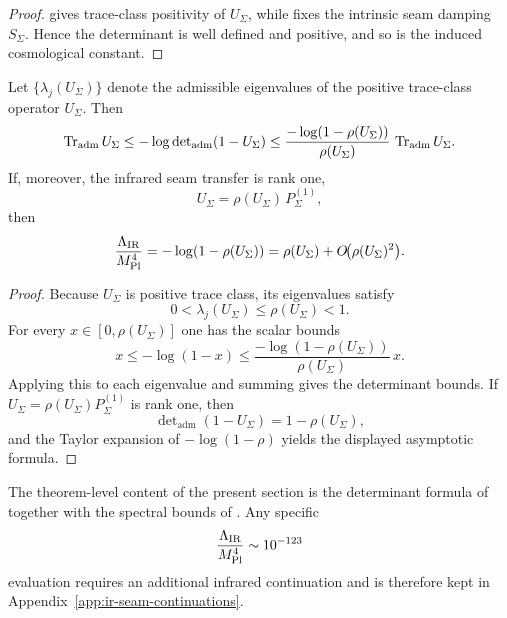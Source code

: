 \begin{proof}
 gives trace-class positivity of
$U_\Sigma$, while  fixes the intrinsic seam damping $S_\Sigma$.
Hence the determinant is well defined and positive, and so is the induced cosmological constant.
\end{proof}

\begin{corollary}
\label{cor:ir-seam-transfer-bounds}
Let $\{\lambda_j(U_\Sigma)\}$ denote the admissible eigenvalues of the positive trace-class
operator $U_\Sigma$. Then
\[
\operatorname{Tr}_{\mathrm{adm}}U_\Sigma
\le
-\log\det\nolimits_{\mathrm{adm}}(1-U_\Sigma)
\le
\frac{-\log(1-\rho(U_\Sigma))}{\rho(U_\Sigma)}\,\operatorname{Tr}_{\mathrm{adm}}U_\Sigma.
\]
If, moreover, the infrared seam transfer is rank one,
\[
U_\Sigma=\rho(U_\Sigma)\,P_\Sigma^{(1)},
\]
then
\[
\frac{\Lambda_{\mathrm{IR}}}{M_{\mathrm{Pl}}^4}
=
-\log(1-\rho(U_\Sigma))
=
\rho(U_\Sigma)+O\!\bigl(\rho(U_\Sigma)^2\bigr).
\]
\end{corollary}

\begin{proof}
Because $U_\Sigma$ is positive trace class, its eigenvalues satisfy
\[
0<\lambda_j(U_\Sigma)\le \rho(U_\Sigma)<1.
\]
For every $x\in[0,\rho(U_\Sigma)]$ one has the scalar bounds
\[
x\le -\log(1-x)\le \frac{-\log(1-\rho(U_\Sigma))}{\rho(U_\Sigma)}\,x.
\]
Applying this to each eigenvalue and summing gives the determinant bounds. If
$U_\Sigma=\rho(U_\Sigma)P_\Sigma^{(1)}$ is rank one, then
\[
\det\nolimits_{\mathrm{adm}}(1-U_\Sigma)=1-\rho(U_\Sigma),
\]
and the Taylor expansion of $-\log(1-\rho)$ yields the displayed asymptotic formula.
\end{proof}

\begin{remark}
The theorem-level content of the present section is the determinant formula of
 together with the spectral bounds of
. Any specific
\[
\frac{\Lambda_{\mathrm{IR}}}{M_{\mathrm{Pl}}^4}\sim 10^{-123}
\]
evaluation requires an additional infrared continuation and is therefore kept in
Appendix~\ref{app:ir-seam-continuations}.
\end{remark}


